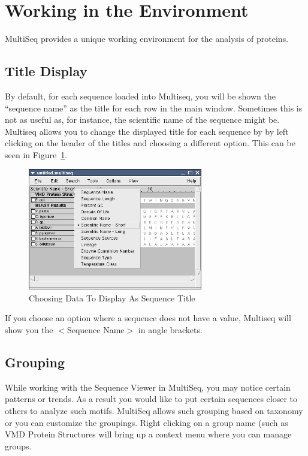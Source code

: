 \label{unit3}
\section{Working in the Environment}
MultiSeq provides a unique working environment for the analysis of
proteins.  

\subsection{Title Display}
By default, for each sequence loaded into Multiseq, you will be shown
the ``sequence name'' as the title for each row in the main window.
Sometimes this is not as useful as, for instance, the scientific name of
the sequence might be.  Multiseq allows you to change the displayed
title for each sequence by by left clicking on the header of the titles
and choosing a different option.  This can be seen in 
Figure~\ref{fig:title_display}.  
\begin{figure}[here]
 \centerline{\includegraphics [width=3in]{./pictures/title_display.jpg}}
 \caption{Choosing Data To Display As Sequence Title}%
 \label{fig:title_display}
\end{figure}
If you choose an option where a sequence does not have a value, Multiseq
will show you the $<$Sequence Name$>$ in angle brackets.

\subsection{Grouping}
While working with the Sequence Viewer in MultiSeq, you may notice
certain patterns or trends.  As a result you would like to put certain
sequences closer to others to analyze such motifs.  MultiSeq allows such
grouping based on taxonomy or you can customize the groupings.  Right
clicking on a group name (such as \textsf{VMD Protein Structures} will bring
up a context menu where you can manage groups.

